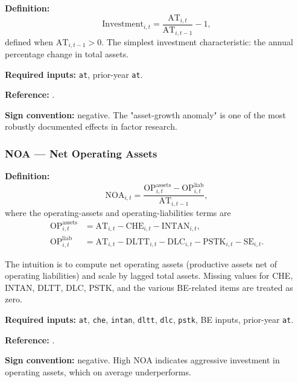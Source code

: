 \textbf{Definition:}
\begin{equation}
\mathrm{Investment}_{i,t} = \frac{\mathrm{AT}_{i,t}}{\mathrm{AT}_{i,t-1}} - 1,
\label{eq:investment}
\end{equation}
defined when $\mathrm{AT}_{i,t-1} > 0$. The simplest investment
characteristic: the annual percentage change in total assets.

\textbf{Required inputs:} \texttt{at}, prior-year \texttt{at}.

\textbf{Reference:} \cite{CooperGulenSchill2008}.

\textbf{Sign convention:} negative. The "asset-growth anomaly" is one
of the most robustly documented effects in factor research.

\subsubsection{NOA --- Net Operating Assets}

\textbf{Definition:}
\begin{equation}
\mathrm{NOA}_{i,t} = \frac{\mathrm{OP}^{\text{assets}}_{i,t}
                            - \mathrm{OP}^{\text{liab}}_{i,t}}
                          {\mathrm{AT}_{i,t-1}},
\label{eq:noa-ratio}
\end{equation}
where the operating-assets and operating-liabilities terms are
\begin{align}
\mathrm{OP}^{\text{assets}}_{i,t} &= \mathrm{AT}_{i,t} - \mathrm{CHE}_{i,t}
                                    - \mathrm{INTAN}_{i,t}, \label{eq:noa-assets}\\
\mathrm{OP}^{\text{liab}}_{i,t} &= \mathrm{AT}_{i,t} - \mathrm{DLTT}_{i,t}
                                  - \mathrm{DLC}_{i,t} - \mathrm{PSTK}_{i,t}
                                  - \mathrm{SE}_{i,t}. \label{eq:noa-liab}
\end{align}

The intuition is to compute net operating assets (productive assets net
of operating liabilities) and scale by lagged total assets. Missing
values for CHE, INTAN, DLTT, DLC, PSTK, and the various BE-related
items are treated as zero.

\textbf{Required inputs:} \texttt{at}, \texttt{che}, \texttt{intan},
\texttt{dltt}, \texttt{dlc}, \texttt{pstk}, BE inputs, prior-year
\texttt{at}.

\textbf{Reference:} \cite{HirshleiferHouTeoh2004}.

\textbf{Sign convention:} negative. High NOA indicates aggressive
investment in operating assets, which on average underperforms.

